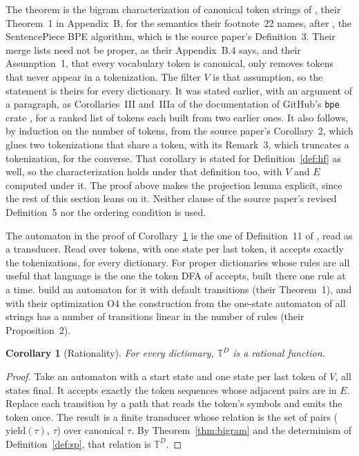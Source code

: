 \documentclass[11pt,a4paper]{article}
\theoremstyle{definition}
\theoremstyle{plain}
\newtheorem{corollary}{Corollary}
\newcommand{\code}[1]{\texttt{#1}}
\newcommand{\T}{\mathbb{T}}
\newcommand{\yield}{\mathrm{yield}}
\begin{document}
The theorem is the bigram characterization of canonical token strings of \citet{vieira2025canonical}, their Theorem~1 in
Appendix~B, for the semantics their footnote~22 names, after \citet{berglund2024dfa}, the SentencePiece BPE algorithm,
which is the source paper's Definition~3. Their merge lists need not be proper, as their Appendix~B.4 says, and their
Assumption~1, that every vocabulary token is canonical, only removes tokens that never appear in a tokenization. The
filter \(V\) is that assumption, so the statement is theirs for every dictionary. It was stated earlier, with an
argument of a paragraph, as Corollaries~III and~IIIa of the documentation of GitHub's \code{bpe} crate
\citep{vanantwerpen2024bpe}, for a ranked list of tokens each built from two earlier ones. It also follows, by induction
on the number of tokens, from the source paper's Corollary~2, which glues two tokenizations that share a token, with its
Remark~3, which truncates a tokenization, for the converse. That corollary is stated for Definition~\ref{def:hf} as
well, so the characterization holds under that definition too, with \(V\) and \(E\) computed under it. The proof above
makes the projection lemma explicit, since the rest of this section leans on it. Neither clause of the source paper's
revised Definition~5 nor the ordering condition is used.

The automaton in the proof of Corollary~\ref{cor:rational} is the one of Definition~11 of \citet{vieira2025canonical},
read as a transducer. Read over tokens, with one state per last token, it accepts exactly the tokenizations, for every
dictionary. For proper dictionaries whose rules are all useful that language is the one the token DFA of
\citet{berglund2024dfa} accepts, built there one rule at a time. \citet{berglund2025compact} build an automaton for it
with default transitions (their Theorem~1), and with their optimization O4 the construction from the one-state automaton
of all strings has a number of transitions linear in the number of rules (their Proposition~2).

\begin{corollary}[Rationality]\label{cor:rational}
For every dictionary, \(\T^D\) is a rational function.
\end{corollary}

\begin{proof}
Take an automaton with a start state and one state per last token of \(V\), all states final. It accepts exactly the
token sequences whose adjacent pairs are in \(E\). Replace each transition by a path that reads the token's symbols and
emits the token once. The result is a finite transducer whose relation is the set of pairs (\(\yield(\tau)\), \(\tau\))
over canonical \(\tau\). By Theorem~\ref{thm:bigram} and the determinism of Definition~\ref{def:sp}, that relation is
\(\T^D\).
\end{proof}
\end{document}
